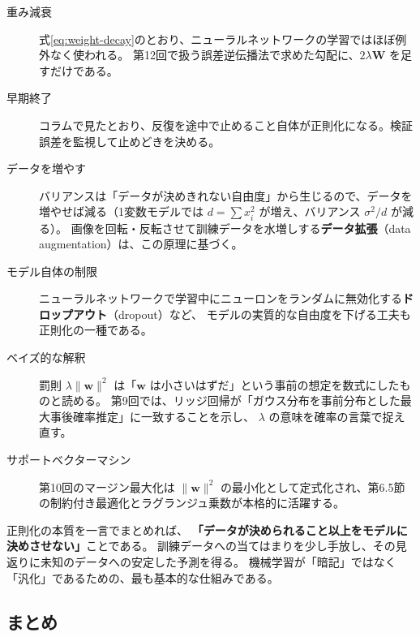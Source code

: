 \begin{description}
  \item[重み減衰]
    式\eqref{eq:weight-decay}のとおり、ニューラルネットワークの学習ではほぼ例外なく使われる。
    第12回で扱う誤差逆伝播法で求めた勾配に、$2\lambda\bm{W}$ を足すだけである。
  \item[早期終了]
    コラムで見たとおり、反復を途中で止めること自体が正則化になる。検証誤差を監視して止めどきを決める。
  \item[データを増やす]
    バリアンスは「データが決めきれない自由度」から生じるので、データを増やせば減る（1変数モデルでは $d = \sum x_i^2$ が増え、バリアンス $\sigma^2/d$ が減る）。
    画像を回転・反転させて訓練データを水増しする\textbf{データ拡張}（data augmentation）は、この原理に基づく。
  \item[モデル自体の制限]
    ニューラルネットワークで学習中にニューロンをランダムに無効化する\textbf{ドロップアウト}（dropout）など、
    モデルの実質的な自由度を下げる工夫も正則化の一種である。
  \item[ベイズ的な解釈]
    罰則 $\lambda\|\bm{w}\|^2$ は「$\bm{w}$ は小さいはずだ」という事前の想定を数式にしたものと読める。
    第9回では、リッジ回帰が「ガウス分布を事前分布とした最大事後確率推定」に一致することを示し、
    $\lambda$ の意味を確率の言葉で捉え直す。
  \item[サポートベクターマシン]
    第10回のマージン最大化は $\|\bm{w}\|^2$ の最小化として定式化され、第6.5節の制約付き最適化とラグランジュ乗数が本格的に活躍する。
\end{description}

正則化の本質を一言でまとめれば、
\textbf{「データが決められること以上をモデルに決めさせない」}ことである。
訓練データへの当てはまりを少し手放し、その見返りに未知のデータへの安定した予測を得る。
機械学習が「暗記」ではなく「汎化」であるための、最も基本的な仕組みである。


\subsection{まとめ}

